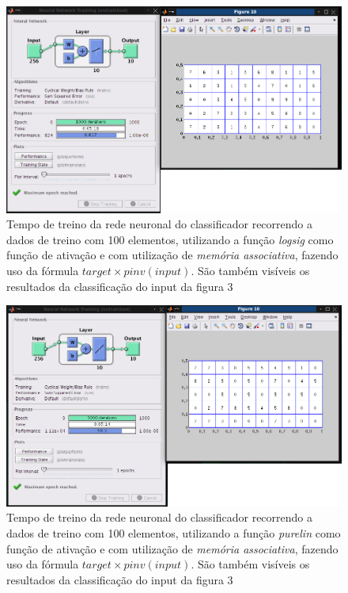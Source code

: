 \documentclass{article}
\begin{document}
\begin{figure}[h]
  \centering
      \includegraphics[scale=0.3]{100_Pinv_Sigmoidal.png}
  \caption{Tempo de treino da rede neuronal do classificador recorrendo a dados de treino com 100 elementos, utilizando a função \emph{logsig} como função de ativação e com utilização de \emph{memória associativa}, fazendo uso da fórmula $target\times pinv(input)$. São também visíveis os resultados da classificação do input da figura 3}
\end{figure}

\clearpage

\begin{figure}[h]
  \centering
      \includegraphics[scale=0.3]{100_Pinv_Linear.png}
  \caption{Tempo de treino da rede neuronal do classificador recorrendo a dados de treino com 100 elementos, utilizando a função \emph{purelin} como função de ativação e com utilização de \emph{memória associativa}, fazendo uso da fórmula $target\times pinv(input)$. São também visíveis os resultados da classificação do input da figura 3}
\end{figure}
\end{document}
